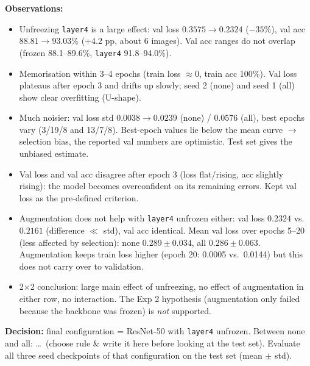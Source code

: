 \textbf{Observations:}
\begin{itemize}
    \item Unfreezing \texttt{layer4} is a large effect: val loss $0.3575 \rightarrow 0.2324$ ($-35\%$),
          val acc $88.81 \rightarrow 93.03\%$ (+4.2 pp, about 6 images). Val acc ranges do not overlap
          (frozen 88.1--89.6\%, \texttt{layer4} 91.8--94.0\%).
    \item Memorisation within 3--4 epochs (train loss $\approx 0$, train acc 100\%). Val loss plateaus after
          epoch 3 and drifts up slowly; seed 2 (none) and seed 1 (all) show clear overfitting (U-shape).
    \item Much noisier: val loss std $0.0038 \rightarrow 0.0239$ (none) / $0.0576$ (all), best epochs vary
          (3/19/8 and 13/7/8). Best-epoch values lie below the mean curve $\rightarrow$ selection bias,
          the reported val numbers are optimistic. Test set gives the unbiased estimate.
    \item Val loss and val acc disagree after epoch 3 (loss flat/rising, acc slightly rising): the model becomes
          overconfident on its remaining errors. Kept val loss as the pre-defined criterion.
    \item Augmentation does not help with \texttt{layer4} unfrozen either: val loss $0.2324$ vs.\ $0.2161$
          (difference $\ll$ std), val acc identical. Mean val loss over epochs 5--20 (less affected by
          selection): none $0.289 \pm 0.034$, all $0.286 \pm 0.063$. Augmentation keeps train loss higher
          (epoch 20: 0.0005 vs.\ 0.0144) but this does not carry over to validation.
    \item 2$\times$2 conclusion: large main effect of unfreezing, no effect of augmentation in either row,
          no interaction. The Exp 2 hypothesis (augmentation only failed because the backbone was frozen)
          is \emph{not} supported.
\end{itemize}
\textbf{Decision:} final configuration = ResNet-50 with \texttt{layer4} unfrozen.
Between none and all: \ldots\ (choose rule \& write it here before looking at the test set).
Evaluate all three seed checkpoints of that configuration on the test set (mean $\pm$ std).
